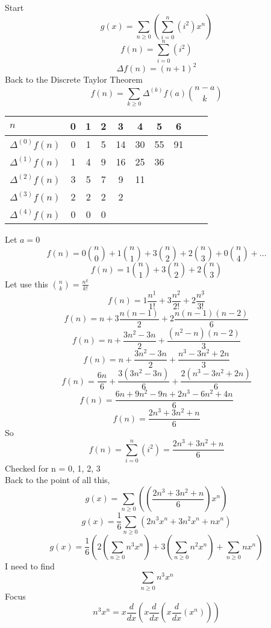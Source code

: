 \documentclass[10pt, AMS Euler]{article}
\newcommand{\ds}{\displaystyle}
\begin{document}
        Start
        $$ g(x) = \sum_{n\geq0} (\sum_{i=0}^n (i^2) x^n) $$
        $$ f(n) = \sum_{i=0}^n (i^2) $$
        $$ \Delta f(n) = (n+1)^2 $$
        Back to the Discrete Taylor Theorem
        $$f(n)=\sum_{k \geq 0}\Delta^{(k)}f(a)\ds\binom{n-a}{k}$$
        \begin{center}
                \begin{tabular}{l|ccccccccc}
                    {\bf $n$ } & 0 & 1 & 2 & 3 & 4 & 5 & 6 & \\
                    \hline
                    {$\Delta^{(0)} f(n)$} & 0 & 1 & 5 & 14 & 30 & 55 & 91 & \\
                    {$\Delta^{(1)} f(n)$} & 1 & 4 & 9 & 16 & 25 & 36 & \\
                    {$\Delta^{(2)} f(n)$} & 3 & 5 & 7 & 9 & 11 & \\
                    {$\Delta^{(3)} f(n)$} & 2 & 2 & 2 & 2 & \\
                    {$\Delta^{(4)} f(n)$} & 0 & 0 & 0 & \\
                \end{tabular}
            \end{center}
        Let $a=0$
        $$ f(n) = 0 \binom{n}{0} + 1 \binom{n}{1} + 3 \binom{n}{2} + 2 \binom{n}{3} + 0 \binom{n}{4} + ... $$
        $$ f(n) = 1 \binom{n}{1} + 3 \binom{n}{2} + 2 \binom{n}{3} $$
        Let use this $\binom{n}{k} = \frac{n^{\underline{k}}}{k!}$
        $$ f(n) = 1 \frac{n^{\underline{1}}}{1!} + 3 \frac{n^{\underline{2}}}{2!} + 2 \frac{n^{\underline{3}}}{3!} $$
        $$ f(n) = n + 3 \frac{n(n-1)}{2} + 2 \frac{n(n-1)(n-2)}{6} $$
        $$ f(n) = n + \frac{3n^2-3n}{2}  + \frac{(n^2-n)(n-2)}{3} $$
        $$ f(n) = n + \frac{3n^2-3n}{2}  + \frac{n^3-3n^2+2n}{3} $$
        $$ f(n) = \frac{6n}{6} + \frac{3(3n^2-3n)}{6}  + \frac{2(n^3-3n^2+2n)}{6} $$
        $$ f(n) = \frac{6n + 9n^2-9n + 2n^3-6n^2+4n}{6} $$
        $$ f(n) = \frac{2n^3 + 3n^2 + n}{6} $$
        So
        $$ f(n) = \sum_{i=0}^n (i^2) = \frac{2n^3 + 3n^2 + n}{6} $$
        Checked for n = 0, 1, 2, 3 \\
        Back to the point of all this,
        $$ g(x) = \sum_{n\geq0} ( ( \frac{2n^3 + 3n^2 + n}{6} ) x^n ) $$
        $$ g(x) = \frac{1}{6} \sum_{n\geq0} ( 2n^3 x^n + 3n^2 x^n + nx^n ) $$
        $$ g(x) = \frac{1}{6} ( 2 (\sum_{n\geq0} n^3 x^n ) + 3 ( \sum_{n\geq0} n^2 x^n ) + \sum_{n\geq0} nx^n ) $$
        I need to find
        $$ \sum_{n\geq0} n^3 x^n $$
        Focus
        $$ n^3 x^n = x \frac{d}{dx} (x \frac{d}{dx} (x \frac{d}{dx} (x^n)) ) $$
\end{document}
